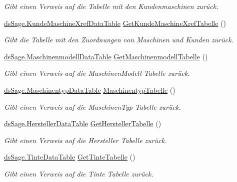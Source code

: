 \begin{DoxyCompactItemize}
\begin{DoxyCompactList}\small\item\em Gibt einen Verweis auf die Tabelle mit den Kundenmaschinen zurück. \end{DoxyCompactList}\item 
\hyperlink{class_products_1_1_data_1_1ds_sage_1_1_kunde_maschine_xref_data_table}{ds\+Sage.\+Kunde\+Maschine\+Xref\+Data\+Table} \hyperlink{class_products_1_1_data_1_1_data_service_a840442934d4324133450f0cf41571f62}{Get\+Kunde\+Maschine\+Xref\+Tabelle} ()
\begin{DoxyCompactList}\small\item\em Gibt die Tabelle mit den Zuordnungen von Maschinen und Kunden zurück. \end{DoxyCompactList}\item 
\hyperlink{class_products_1_1_data_1_1ds_sage_1_1_maschinenmodell_data_table}{ds\+Sage.\+Maschinenmodell\+Data\+Table} \hyperlink{class_products_1_1_data_1_1_data_service_a98d18c5505a9cc6a190f95cbd1a117bd}{Get\+Maschinenmodell\+Tabelle} ()
\begin{DoxyCompactList}\small\item\em Gibt einen Verweis auf die Maschinen\+Modell Tabelle zurück. \end{DoxyCompactList}\item 
\hyperlink{class_products_1_1_data_1_1ds_sage_1_1_maschinentyp_data_table}{ds\+Sage.\+Maschinentyp\+Data\+Table} \hyperlink{class_products_1_1_data_1_1_data_service_a7a7886cfb503f86e3aae02611cb0b908}{Maschinentyp\+Tabelle} ()
\begin{DoxyCompactList}\small\item\em Gibt einen Verweis auf die Maschinen\+Typ Tabelle zurück. \end{DoxyCompactList}\item 
\hyperlink{class_products_1_1_data_1_1ds_sage_1_1_hersteller_data_table}{ds\+Sage.\+Hersteller\+Data\+Table} \hyperlink{class_products_1_1_data_1_1_data_service_ac71dc439eb23d941f9ce932d476e6f5c}{Get\+Hersteller\+Tabelle} ()
\begin{DoxyCompactList}\small\item\em Gibt einen Verweis auf die Hersteller Tabelle zurück. \end{DoxyCompactList}\item 
\hyperlink{class_products_1_1_data_1_1ds_sage_1_1_tinte_data_table}{ds\+Sage.\+Tinte\+Data\+Table} \hyperlink{class_products_1_1_data_1_1_data_service_addedd5d31288abfa8aed4da95ed9b072}{Get\+Tinte\+Tabelle} ()
\begin{DoxyCompactList}\small\item\em Gibt einen Verweis auf die Tinte Tabelle zurück. \end{DoxyCompactList}\item 

\end{DoxyCompactItemize}
